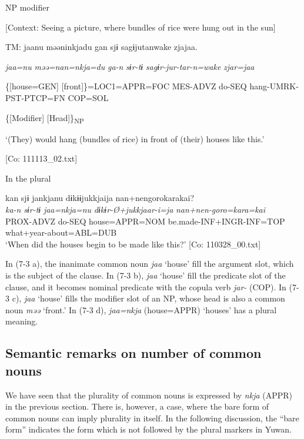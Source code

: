 \ex \label{ex:7:3c}NP modifier

    [Context: Seeing a picture, where bundles of rice were hung out in the sun]

    TM:  jaanu  məəninkjadu  gan  sjɨ   sagɨjutanwake  zjajaa.

      \textit{jaa=nu}  \textit{məə=nan=nkja=du}  \textit{ga-n}  \textit{sɨr-tɨ} \textit{sagɨr-jur-tar-n=wake}  \textit{zjar=jaa}
                                                                                
      \{[house=GEN]  [front]\}=LOC1=APPR=FOC  MES-ADVZ  do-SEQ                  hang-UMRK-PST-PTCP=FN  COP=SOL

      \{[Modifier]  [Head]\}\textsubscript{NP}    

      ‘(They) would hang (bundles of rice) in front of (their) houses like this.’

      [Co: 111113\_02.txt]

\ex \label{ex:7:3d}In the plural

\glll  kan  sjɨ  jankjanu  dɨkɨɨjukkjaija {\textbar}nan+nengoro{\textbar}karakai?\\
\textit{ka-n}  \textit{sɨr-tɨ}  \textit{jaa=nkja=nu}  \textit{dɨkɨr-Ø+jukkjaar-i=ja}  \textit{nan+nen-goro=kara=kai}\\
PROX-ADVZ  do-SEQ  house=APPR=NOM  be.made-INF+INGR-INF=TOP  what+year-about=ABL=DUB\\
\glt ‘When did the houses begin to be made like this?’ [Co: 110328\_00.txt]
\z
\z

In (7-3 a), the inanimate common noun \textit{jaa} ‘house’ fill the argument slot, which is the subject of the clause. In (7-3 b), \textit{jaa} ‘house’ fill the predicate slot of the clause, and it becomes nominal predicate with the copula verb \textit{jar-} (COP). In (7-3 c), \textit{jaa} ‘house’ fills the modifier slot of an NP, whose head is also a common noun \textit{məə} ‘front.’ In (7-3 d), \textit{jaa=nkja} (house=APPR) ‘houses’ has a plural meaning.

\subsection{Semantic remarks on number of common nouns}

We have seen that the plurality of common nouns is expressed by \textit{nkja} (APPR) in the previous section. There is, however, a case, where the bare form of common nouns can imply plurality in itself. In the following discussion, the “bare form” indicates the form which is not followed by the plural markers in Yuwan.

